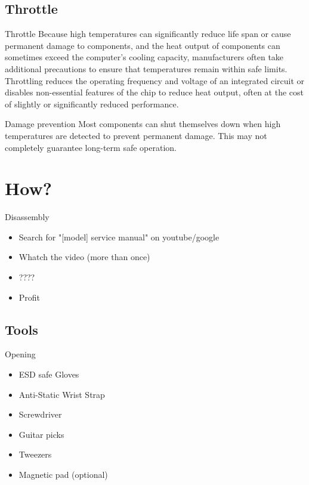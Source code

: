 \documentclass{beamer}
\begin{document}
\subsection{Throttle}
\begin{frame}{Throttle}
    Because high temperatures can significantly reduce life span or cause permanent damage to components, and the heat output of components can sometimes exceed the computer's cooling capacity, manufacturers often take additional precautions to ensure that temperatures remain within safe limits.
    \newline
    \newline
    Throttling reduces the operating frequency and voltage of an integrated circuit or disables non-essential features of the chip to reduce heat output, often at the cost of slightly or significantly reduced performance.
\end{frame}

\begin{frame}{Damage prevention}
    Most components can shut themselves down when high temperatures are detected to prevent permanent damage.
    \newline
    \newline
    This may not completely guarantee long-term safe operation.
\end{frame}

\section{How?}

\begin{frame}{Disassembly}
    \begin{itemize}
        \item Search for "[model] service manual" on youtube/google
        \item Whatch the video (more than once)
        \item ????
        \item Profit
    \end{itemize}
\end{frame}

\subsection{Tools}

\begin{frame}{Opening}
    \begin{itemize}
        \item ESD safe Gloves
        \item Anti-Static Wrist Strap
        \item Screwdriver
        \item Guitar picks
        \item Tweezers
        \item Magnetic pad (optional)
    \end{itemize}
\end{frame}
\end{document}
